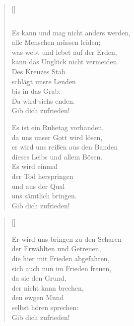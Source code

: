 \begin{multicols}{2}
\begin{verse}[\versewidth]
\begin{verbatim}
\end{verbatim}

 Es kann und mag nicht anders werden,\\
alle Menschen müssen leiden;\\
was webt und lebet auf der Erden,\\
kann das Unglück nicht vermeiden.\\
Des Kreuzes Stab\\
schlägt unsre Lenden\\
bis in das Grab:\\
Da wird sichs enden.\\
Gib dich zufrieden!

 Es ist ein Ruhetag vorhanden,\\
da uns unser Gott wird lösen,\\
er wird uns reißen aus den Banden\\
dieses Leibs und allem Bösen.\\
Es wird einmal\\
der Tod herspringen\\
und aus der Qual\\
uns sämtlich bringen.\\
Gib dich zufrieden!
\end{verse}
\end{multicols}

\begin{center}
\settowidth{\versewidth}{Der, vor dem die Welt erschrickt,}
\begin{verse}[\versewidth]

 Er wird uns bringen zu den Scharen\\
der Erwählten und Getreuen,\\
die hier mit Frieden abgefahren,\\
sich auch nun im Frieden freuen,\\
da sie den Grund,\\
der nicht kann brechen,\\
den ewgen Mund\\
selbst hören sprechen:\\
Gib dich zufrieden!

\end{verse}
\end{center}


